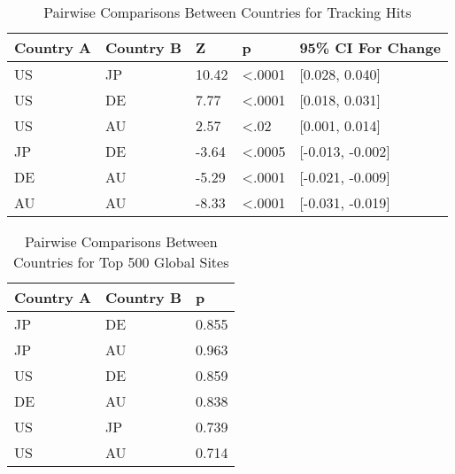 \documentclass[conference]{IEEEtran}
\begin{document}
\begin{table}[t]	
\centering
\caption{Pairwise Comparisons Between Countries for Tracking Hits}
\label{pairwise}
\begin{tabular}{|l|l|l|l|l|}
   \hline
\textbf{Country A} & \textbf{Country B} & \textbf{Z}     & \textbf{p}              & 9\textbf{5\% CI For Change}   \\    \hline
US        & JP        & 10.42 & \textless.0001 & {[}0.028, 0.040{]}   \\   \hline
US        & DE        & 7.77  & \textless.0001 & {[}0.018, 0.031{]}   \\   \hline
US        & AU        & 2.57  & \textless.02   & {[}0.001, 0.014{]}   \\   \hline
JP        & DE        & -3.64 & \textless.0005 & {[}-0.013, -0.002{]} \\   \hline
DE        & AU        & -5.29 & \textless.0001 & {[}-0.021, -0.009{]} \\   \hline
AU        & AU        & -8.33 & \textless.0001 & {[}-0.031, -0.019{]}\\   \hline
\end{tabular}
\end{table}

\begin{table}[t]
\centering
\caption{Pairwise Comparisons Between Countries for Top 500 Global Sites}
\label{pairwise500}
\begin{tabular}{|l|l|l|}
\hline
\textbf{Country A} & \textbf{Country B}  & \textbf{p} \\ \hline
JP                            & DE                            & 0.855                         \\ \hline
JP                            & AU                            & 0.963\\ \hline
US                            & DE                            & 0.859                         \\ \hline
DE                            & AU                            & 0.838                         \\ \hline
US                            & JP                            & 0.739                         \\ \hline
US                            & AU                            & 0.714                         \\ \hline        
\end{tabular}
\end{table}
\end{document}
